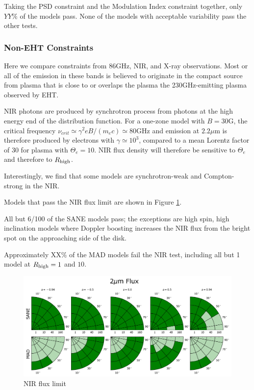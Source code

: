 Taking the PSD constraint and the Modulation Index constraint together, only $YY\%$ of the models pass.  None of the models with acceptable variability pass the other tests.

\subsubsection{Non-EHT Constraints}

Here we compare constraints from 86GHz, NIR, and X-ray observations.  Most or all of the emission in these bands is believed to originate in the compact source from plasma that is close to or overlaps the plasma the 230GHz-emitting plasma observed by EHT.



NIR photons are produced by synchrotron process from photons at the high energy end of the distribution function.  For a one-zone model with $B = 30$G, the  critical frequency $\nu_{crit} \simeq \gamma^2 e B/(m_e c) \simeq 80$GHz and emission at $2.2\mu$m is therefore produced by electrons with $\gamma \simeq 10^3$, compared to a mean Lorentz factor of $30$ for plasma with $\Theta_e = 10$.  NIR flux density will therefore be sensitive to $\Theta_e$ and therefore to $R_\mathrm{high}$.

Interestingly, we find that some models are synchrotron-weak and Compton-strong in the NIR.  

Models that pass the NIR flux limit are shown in Figure \ref{fig:cmp_2um_flux}.

All but 6/100 of the SANE models pass; the exceptions are high spin, high inclination models where Doppler boosting increases the NIR flux from the bright spot on the approaching side of the disk.

Approximately XX\% of the MAD models fail the NIR test, including all but 1 model at $R_\mathrm{high} = 1$ and $10$.

\begin{figure}
  \centering
  \includegraphics[width=\columnwidth]{./figures/2um_flux_Constraints.png}
  \caption{NIR flux limit}
  \label{fig:cmp_2um_flux}
\end{figure}

